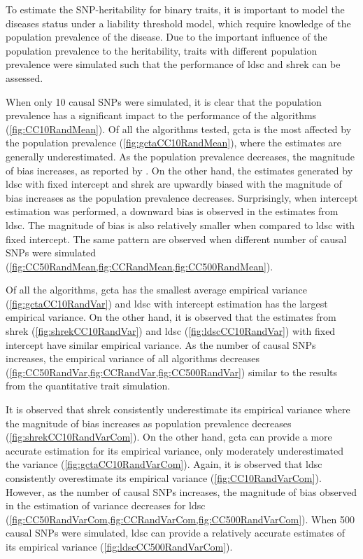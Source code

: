 \documentclass[12pt]{scrbook}
\begin{document}
To estimate the \gls{SNP}-heritability for binary traits, it is important to model the diseases status under a liability threshold model, which require knowledge of the population prevalence of the disease.
Due to the important influence of the population prevalence to the heritability, traits with different population prevalence were simulated such that the performance of \gls{ldsc} and \gls{shrek} can be assessed.

When only 10 causal \glspl{SNP} were simulated, it is clear that the population prevalence has a significant impact to the performance of the algorithms (\cref{fig:CC10RandMean}). 
Of all the algorithms tested, \gls{gcta} is the most affected by the population prevalence (\cref{fig:gctaCC10RandMean}), where the estimates are generally underestimated.
As the population prevalence decreases, the magnitude of bias increases, as reported by \citet{Golan2014}.
On the other hand, the estimates generated by \gls{ldsc} with fixed intercept and \gls{shrek} are upwardly biased with the magnitude of bias increases as the population prevalence decreases.
Surprisingly, when intercept estimation was performed, a downward bias is observed in the estimates from \gls{ldsc}.
The magnitude of bias is also relatively smaller when compared to \gls{ldsc} with fixed intercept.
The same pattern are observed when different number of causal \glspl{SNP} were simulated (\cref{fig:CC50RandMean,fig:CCRandMean,fig:CC500RandMean}).

Of all the algorithms, \gls{gcta} has the smallest average empirical variance (\cref{fig:gctaCC10RandVar}) and \gls{ldsc} with intercept estimation has the largest empirical variance.
On the other hand, it is observed that the estimates from \gls{shrek} (\cref{fig:shrekCC10RandVar}) and \gls{ldsc} (\cref{fig:ldscCC10RandVar}) with fixed intercept have similar empirical variance.
As the number of causal \glspl{SNP} increases, the empirical variance of all algorithms decreases (\cref{fig:CC50RandVar,fig:CCRandVar,fig:CC500RandVar}) similar to the results from the quantitative trait simulation.

It is observed that \gls{shrek} consistently underestimate its empirical variance where the magnitude of bias increases as population prevalence decreases (\cref{fig:shrekCC10RandVarCom}).
On the other hand, \gls{gcta} can provide a more accurate estimation for its empirical variance, only moderately underestimated the variance  (\cref{fig:gctaCC10RandVarCom}).
Again, it is observed that \gls{ldsc} consistently overestimate its empirical variance (\cref{fig:CC10RandVarCom}). 
However, as the number of causal \glspl{SNP} increases, the magnitude of bias observed in the estimation of variance decreases for \gls{ldsc} (\cref{fig:CC50RandVarCom,fig:CCRandVarCom,fig:CC500RandVarCom}). 
When 500 causal \glspl{SNP} were simulated, \gls{ldsc} can provide a relatively accurate estimates of its empirical variance (\cref{fig:ldscCC500RandVarCom}).
\end{document}
